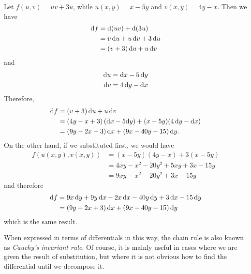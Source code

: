 \documentclass[12pt]{amsart}
\begin{document}
\begin{eg}
  Let $f(u,v) = u v + 3u$, while $u(x,y) = x-5y$ and $v(x,y) = 4y-x$.
  Then we have
  \begin{align*}
    \mathrm{d} f &= \mathrm{d}(u v) + \mathrm{d}(3u)\\
    &= v \,\mathrm{d} u + u\,\mathrm{d} v + 3 \,\mathrm{d} u\\
    &= (v+3)\,\mathrm{d} u + u\,\mathrm{d} v
  \end{align*}
  and
  \begin{align*}
    \mathrm{d} u &= \mathrm{d} x - 5\, \mathrm{d} y\\
    \mathrm{d} v &= 4\,\mathrm{d} y - \mathrm{d} x
  \end{align*}
  Therefore,
  \begin{align*}
    \mathrm{d} f &= (v+3)\,\mathrm{d} u + u\,\mathrm{d} v\\
    &= (4y-x+3)\,(\mathrm{d} x - 5 \mathrm{d} y) + (x-5y) (4\,\mathrm{d} y - \mathrm{d} x) \\
    &= (9y-2x+3)\,\mathrm{d} x + (9x - 40y - 15)\,\mathrm{d} y.
  \end{align*}
  On the other hand, if we substituted first, we would have
  \begin{align*}
    f(u(x,y),v(x,y)) &= (x-5y)(4y-x) + 3(x-5y)\\
    &= 4xy - x^2 - 20y^2 + 5xy + 3x - 15 y\\
    &= 9xy - x^2 - 20y^2 + 3x - 15 y
  \end{align*}
  and therefore
  \begin{align*}
    \mathrm{d} f &= 9x\, \mathrm{d} y + 9y\, \mathrm{d} x - 2 x\,\mathrm{d} x - 40 y\,\mathrm{d} y + 3\,\mathrm{d} x - 15\,\mathrm{d} y\\
    &= (9y - 2x +3)\,\mathrm{d} x + (9x - 40y - 15)\,\mathrm{d} y
  \end{align*}
  which is the same result.
\end{eg}

When expressed in terms of differentials in this way, the chain rule is also known as \emph{Cauchy's invariant rule}.
Of course, it is mainly useful in cases where we are given the result of substitution, but where it is not obvious how to find the differential until we decompose it.
\end{document}
